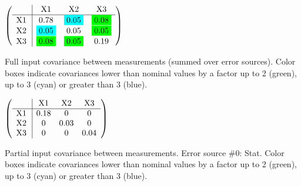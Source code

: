\begin{table}[H]
\scriptsize
\begin{center}
\renewcommand{\arraystretch}{1.1}
\begin{math}\left(\begin{array}{c|ccc}
 & \mathrm{X1} & 
\mathrm{X2} & 
\mathrm{X3} \\
\hline
\mathrm{X1} \hspace*{2pt} &       0.78 &  \colorbox{Cyan1}{$      0.05$} &  \colorbox{Green1}{$      0.08$} \\
\mathrm{X2} \hspace*{2pt} &  \colorbox{Cyan1}{$      0.05$} &       0.05 &  \colorbox{Green1}{$      0.05$} \\
\mathrm{X3} \hspace*{2pt} &  \colorbox{Green1}{$      0.08$} &  \colorbox{Green1}{$      0.05$} &       0.19 \\
\end{array}\right)\end{math}
\caption{Full input covariance between measurements (summed over error sources). Color boxes indicate covariances lower than nominal values by a factor up to 2 (green), up to 3 (cyan) or greater than 3 (blue).}
\renewcommand{\arraystretch}{1}
\end{center}
\end{table}
\begin{table}[H]
\scriptsize
\begin{center}
\renewcommand{\arraystretch}{1.1}
\begin{math}\left(\begin{array}{c|ccc}
 & \mathrm{X1} & 
\mathrm{X2} & 
\mathrm{X3} \\
\hline
\mathrm{X1} \hspace*{2pt} &       0.18 &  0 &  0 \\
\mathrm{X2} \hspace*{2pt} &  0 &       0.03 &  0 \\
\mathrm{X3} \hspace*{2pt} &  0 &  0 &       0.04 \\
\end{array}\right)\end{math}
\caption{Partial input covariance between measurements. Error source \#0: Stat. Color boxes indicate covariances lower than nominal values by a factor up to 2 (green), up to 3 (cyan) or greater than 3 (blue).}
\renewcommand{\arraystretch}{1}
\end{center}
\end{table}
